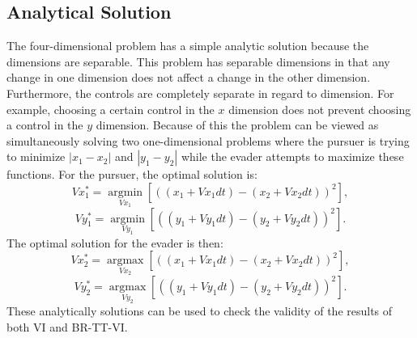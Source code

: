 \subsection{Analytical Solution}
The four-dimensional problem has a simple analytic solution because the dimensions are separable. This problem has separable dimensions in that any change in one dimension does not affect a change in the other dimension. Furthermore, the controls are completely separate in regard to dimension. For example, choosing a certain control in the $x$ dimension does not prevent choosing a control in the $y$ dimension. Because of this the problem can be viewed as simultaneously solving two one-dimensional problems where the pursuer is trying to minimize $|x_1-x_2|$ and $|y_1-y_2|$ while the evader attempts to maximize these functions. For the pursuer, the optimal solution is:
\begin{equation}\label{puroptx}
Vx_1^*= \underset{Vx_1 }{\operatorname{arg min }}[((x_1 + Vx_1dt)-(x_2+Vx_2dt))^2],
\end{equation}
\begin{equation}\label{puropty}
Vy_1^*= \underset{Vy_1 }{\operatorname{arg min }}[((y_1 + Vy_1dt)-(y_2+Vy_2dt))^2].
\end{equation}
The optimal solution for the evader is then:
\begin{equation}\label{evadoptx}
Vx_2^*= \underset{Vx_2 }{\operatorname{arg max }}[((x_1 + Vx_1dt)-(x_2+Vx_2dt))^2],
\end{equation}
\begin{equation}\label{evadopty}
Vy_2^*= \underset{Vy_2 }{\operatorname{arg max }}[((y_1 + Vy_1dt)-(y_2+Vy_2dt))^2].
\end{equation}
These analytically solutions can be used to check the validity of the results of both VI and BR-TT-VI. 

